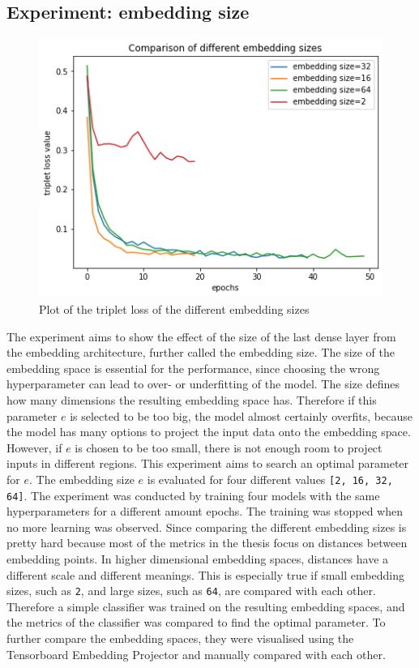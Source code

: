 \subsection{Experiment: embedding size}
\label{sub:Experiment-Embedding-Size}
\begin{figure}[htb]
\centering
    \includegraphics[width=0.5\linewidth]{study-doc/experiment_embedding_size/assets/plot_embedding_sizes.png}
    \caption{Plot of the triplet loss of the different embedding sizes}
    \label{fig:plot-embeddings-epochs}
\end{figure}
\noindent
The experiment aims to show the effect of the size of the last dense layer from the embedding architecture, further called the embedding size. The size of the embedding space is essential for the performance, since choosing the wrong hyperparameter can lead to over- or underfitting of the model. The size defines how many dimensions the resulting embedding space has. Therefore if this parameter $e$ is selected to be too big, the model almost certainly overfits, because the model has many options to project the input data onto the embedding space. However, if $e$ is chosen to be too small, there is not enough room to project inputs in different regions. This experiment aims to search an optimal parameter for $e$. The embedding size $e$ is evaluated for four different values \texttt{[2, 16, 32, 64]}.
\newline
\newline
The experiment was conducted by training four models with the same hyperparameters for a different amount epochs. The training was stopped when no more learning was observed. Since comparing the different embedding sizes is pretty hard because most of the metrics in the thesis focus on distances between embedding points. In higher dimensional embedding spaces, distances have a different scale and different meanings. This is especially true if small embedding sizes, such as \texttt{2}, and large sizes, such as \texttt{64}, are compared with each other. Therefore a simple classifier was trained on the resulting embedding spaces, and the metrics of the classifier was compared to find the optimal parameter. To further compare the embedding spaces, they were visualised using the Tensorboard Embedding Projector and manually compared with each other.
